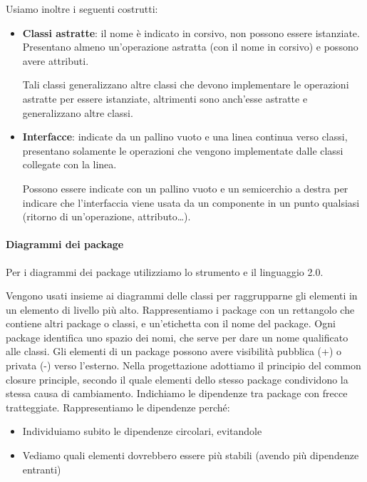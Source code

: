         Usiamo inoltre i seguenti costrutti:
            \begin{itemize}
                \item \textbf{Classi astratte}: il nome è indicato in corsivo, non possono essere istanziate. Presentano almeno un'operazione astratta (con il nome in corsivo) e possono avere attributi.\par
                Tali classi generalizzano altre classi che devono implementare le operazioni astratte per essere istanziate, altrimenti sono anch'esse astratte e generalizzano altre classi.
                \item \textbf{Interfacce}: indicate da un pallino vuoto e una linea continua verso classi, presentano solamente le operazioni che vengono implementate dalle classi collegate con la linea.\par
                Possono essere indicate con un pallino vuoto e un semicerchio a destra per indicare che l'interfaccia viene usata da un componente in un punto qualsiasi (ritorno di un'operazione, attributo\dots).
            \end{itemize}


        \paragraph{Diagrammi dei package}\label{PP:Sviluppo:DiagrammiPackage}
        Per i diagrammi dei package utilizziamo lo strumento  e il linguaggio  2.0.\par
        Vengono usati insieme ai diagrammi delle classi per raggrupparne gli elementi in un elemento di livello più alto.
        Rappresentiamo i package con un rettangolo che contiene altri package o classi, e un'etichetta con il nome del package.
        Ogni package identifica uno spazio dei nomi, che serve per dare un nome qualificato alle classi.
        Gli elementi di un package possono avere visibilità pubblica (+) o privata (-) verso l'esterno.
		Nella progettazione adottiamo il principio del common closure principle, secondo il quale elementi dello stesso
		package condividono la stessa causa di cambiamento.
        Indichiamo le dipendenze tra package con frecce tratteggiate.
        Rappresentiamo le dipendenze perché:
        \begin{itemize}
            \item Individuiamo subito le dipendenze circolari, evitandole
            \item Vediamo quali elementi dovrebbero essere più stabili (avendo più dipendenze entranti)
        \end{itemize}


